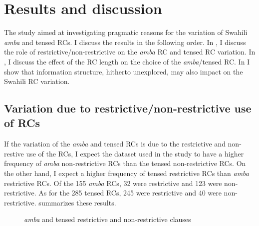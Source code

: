\documentclass[output=paper,colorlinks,citecolor=brown]{langscibook}
\begin{document}
\section{Results and discussion}\label{sec:mwamzandi:4}

The study aimed at investigating pragmatic reasons for the variation of Swahili \textit{amba} and tensed RCs. I discuss the results in the following order. In , I discuss the role of restrictive/non-restrictive on the \textit{amba} RC and tensed RC variation. In , I discuss the effect of the RC length on the choice of the \textit{amba}/tensed RC. In  I show that information structure, hitherto unexplored, may also impact on the Swahili RC variation.

\subsection{Variation due to restrictive/non-restrictive use of RCs}\label{sec:mwamzandi:4.1}

If the variation of the \textit{amba} and tensed RCs is due to the restrictive and non-restive use of the RCs, I expect the dataset used in the study to have a higher frequency of \textit{amba} non-restrictive RCs than the tensed non-restrictive RCs. On the other hand, I expect a higher frequency of tensed restrictive RCs than \textit{amba} restrictive RCs. Of the 155 \textit{amba} RCs, 32 were restrictive and 123 were non-restrictive. As for the 285 tensed RCs, 245 were restrictive and 40 were non-restrictive.  summarizes these results.

\begin{figure}
    \caption{\textit{amba} and tensed restrictive and non-restrictive clauses}
    \label{fig:mwamzandi:1}
\end{figure}
\end{document}
